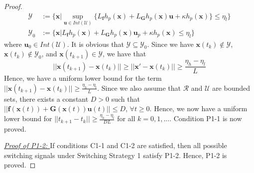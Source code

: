 \documentclass[10pt,a4paper]{amsart}
\begin{document}
\begin{proof}
    \begin{align*}
        \mathcal{Y} &:= \{\mathbf{x}|\sup_{\mathbf{u}\in Int(\mathcal{U})}\{L_\mathbf{f}h_p(\mathbf{x}) + L_{\mathbf{G}}h_p(\mathbf{x})\mathbf{u}+\kappa h_p(\mathbf{x})\}\leq \eta_l\}\\
        \mathcal{Y}_0 &:= \{\mathbf{x}| L_\mathbf{f}h_p(\mathbf{x}) + L_{\mathbf{G}}h_p(\mathbf{x})\mathbf{u}_p+\kappa h_p(\mathbf{x}) \leq \eta_l\}
    \end{align*}
    where $\mathbf{u}_0\in Int(\mathcal{U})$. It is obvious that $\mathcal{Y}\subseteq\mathcal{Y}_0$. Since we have $\mathbf{x}(t_k)\notin\mathcal{Y}$, $\mathbf{x}(t_k)\notin\mathcal{Y}_0$, and $\mathbf{x}(t_{k+1})\in\mathcal{Y}$, we have that
    \begin{equation*}
        ||\mathbf{x}(t_{k+1})- \mathbf{x}(t_k)||\geq||\mathbf{x}'- \mathbf{x}(t_k)||\geq {\frac{\eta_h-\eta_l}{L}}
    \end{equation*}
    Hence, we have a uniform lower bound for the term $||\mathbf{x}(t_{k+1})- \mathbf{x}(t_k)||\geq \frac{\eta_h-\eta_l}{L}$. {Since we also assume that $\mathcal{R}$ and $\mathcal{U}$ are bounded sets, there exists a constant $D>0$ such that $||\mathbf{f}(\mathbf{x}(t)) + \mathbf{G}(\mathbf{x}(t))\mathbf{u}(t)|| \leq D$, $\forall t\geq 0$. Hence, we now have a uniform lower bound for $||t_{k+1}-t_k||\geq \frac{\eta_h-\eta_l}{DL}$ for all $k=0,1,...$.} 
    Condition P1-1 is now proved.

    \textit{\underline{Proof of P1-2: }} If conditions C1-1 and C1-2 are satisfied, then all possible switching signals under Switching Strategy 1 satisfy P1-2. Hence, P1-2 is proved.
    
\end{proof}
\end{document}
